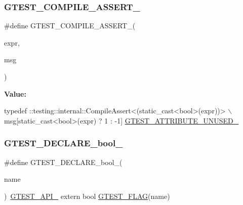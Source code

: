 \subsubsection{\texorpdfstring{G\+T\+E\+S\+T\+\_\+\+C\+O\+M\+P\+I\+L\+E\+\_\+\+A\+S\+S\+E\+R\+T\+\_\+}{GTEST\_COMPILE\_ASSERT\_}}
{\footnotesize\ttfamily \#define G\+T\+E\+S\+T\+\_\+\+C\+O\+M\+P\+I\+L\+E\+\_\+\+A\+S\+S\+E\+R\+T\+\_\+(\begin{DoxyParamCaption}\item[{}]{expr,  }\item[{}]{msg }\end{DoxyParamCaption})}

{\bfseries Value\+:}
\begin{DoxyCode}
typedef ::testing::internal::CompileAssert<(static\_cast<bool>(expr))> \(\backslash\)
      msg[\textcolor{keyword}{static\_cast<}\textcolor{keywordtype}{bool}\textcolor{keyword}{>}(expr) ? 1 : -1] \hyperlink{gtest-port_8h_a01f3b31960fc7c4c7ee4b398a914f89a}{GTEST\_ATTRIBUTE\_UNUSED\_}
\end{DoxyCode}
\mbox{\label{gtest-port_8h_a14eb0e9c6e0df765d1fbfd2db6966d14}} 
\subsubsection{\texorpdfstring{G\+T\+E\+S\+T\+\_\+\+D\+E\+C\+L\+A\+R\+E\+\_\+bool\+\_\+}{GTEST\_DECLARE\_bool\_}}
{\footnotesize\ttfamily \#define G\+T\+E\+S\+T\+\_\+\+D\+E\+C\+L\+A\+R\+E\+\_\+bool\+\_\+(\begin{DoxyParamCaption}\item[{}]{name }\end{DoxyParamCaption})~\hyperlink{gtest-port_8h_aa73be6f0ba4a7456180a94904ce17790}{G\+T\+E\+S\+T\+\_\+\+A\+P\+I\+\_\+} extern bool \hyperlink{gtest-port_8h_a828f4e34a1c4b510da50ec1563e3562a}{G\+T\+E\+S\+T\+\_\+\+F\+L\+AG}(name)}

\mbox{\label{gtest-port_8h_aab2ee98cb616054b1d3a7dc71efe81fc}} 
